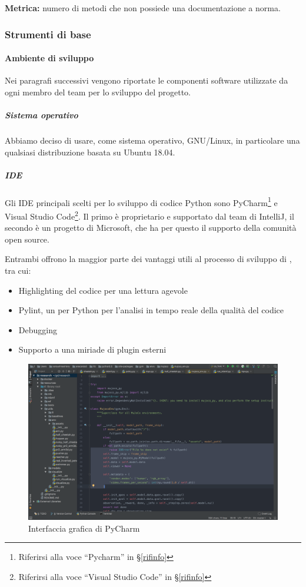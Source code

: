         \textbf{Metrica:} numero di metodi che non possiede una documentazione a norma.

        \subsubsection{Strumenti di base}\label{PP:Sviluppo:Strumenti}

	    \paragraph{Ambiente di sviluppo}\label{PP:Sviluppo:Strumenti:AmbienteSviluppo}
	    Nei paragrafi successivi vengono riportate le componenti software utilizzate da ogni membro del team per lo sviluppo del progetto.


	    \subparagraph{Sistema operativo}\label{PP:Sviluppo:Strumenti:AmbienteSviluppo:SistemaOperativo}
	    Abbiamo deciso di usare, come sistema operativo, GNU/Linux, in particolare una qualsiasi distribuzione basata su Ubuntu 18.04.

	    \subparagraph{IDE}\label{PP:Sviluppo:Strumenti:AmbienteSviluppo:IDE} %
		Gli IDE principali scelti per lo sviluppo di codice Python sono
		{PyCharm}\footnote{Riferirsi alla voce ``Pycharm'' in \S\ref{rifinfo}} e
		{Visual Studio Code}\footnote{Riferirsi alla voce ``Visual Studio Code'' in \S\ref{rifinfo}}.
		Il primo è proprietario e supportato dal team di IntelliJ, il secondo è un progetto  di Microsoft, che ha
		per questo il supporto della comunità open source.\par
		Entrambi offrono la maggior parte dei vantaggi utili al processo di sviluppo di \progetto, tra cui:
		\begin{itemize}
			\item Highlighting del codice per una lettura agevole
			\item Pylint, un  per Python per l'analisi in tempo reale della qualità del codice
			\item Debugging
			\item Supporto a una miriade di plugin esterni
		\end{itemize}

		\begin{figure}[H]
			\includegraphics[width=\textwidth]{img/pycharm.png}
			\caption{Interfaccia grafica di PyCharm}
		\end{figure}
